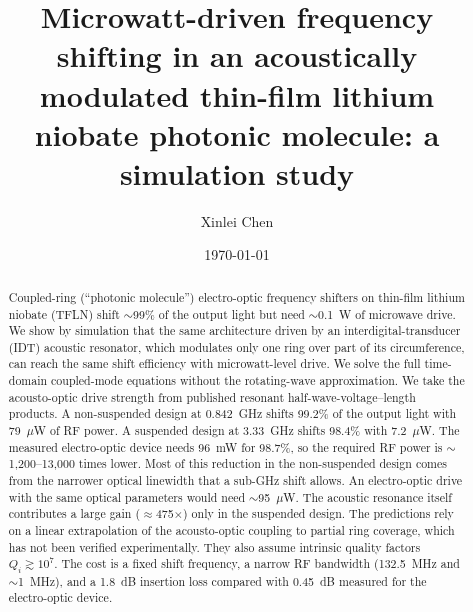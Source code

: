 \documentclass[aps,prl,reprint,superscriptaddress,amsmath,amssymb,floatfix]{revtex4-2}
\begin{document}
\title{Microwatt-driven frequency shifting in an acoustically modulated thin-film lithium niobate photonic molecule: a simulation study}

\author{Xinlei Chen}

\date{\today}

\begin{abstract}
Coupled-ring (``photonic molecule'') electro-optic frequency shifters on thin-film lithium niobate (TFLN) shift $\sim$99\% of the output light but need $\sim$0.1~W of microwave drive. We show by simulation that the same architecture driven by an interdigital-transducer (IDT) acoustic resonator, which modulates only one ring over part of its circumference, can reach the same shift efficiency with microwatt-level drive. We solve the full time-domain coupled-mode equations without the rotating-wave approximation. We take the acousto-optic drive strength from published resonant half-wave-voltage--length products. A non-suspended design at 0.842~GHz shifts 99.2\% of the output light with 79~$\mu$W of RF power. A suspended design at 3.33~GHz shifts 98.4\% with 7.2~$\mu$W. The measured electro-optic device needs 96~mW for 98.7\%, so the required RF power is $\sim$1{,}200--13{,}000 times lower. Most of this reduction in the non-suspended design comes from the narrower optical linewidth that a sub-GHz shift allows. An electro-optic drive with the same optical parameters would need $\sim$95~$\mu$W. The acoustic resonance itself contributes a large gain ($\approx$475$\times$) only in the suspended design. The predictions rely on a linear extrapolation of the acousto-optic coupling to partial ring coverage, which has not been verified experimentally. They also assume intrinsic quality factors $Q_i\gtrsim10^7$. The cost is a fixed shift frequency, a narrow RF bandwidth (132.5~MHz and $\sim$1~MHz), and a 1.8~dB insertion loss compared with 0.45~dB measured for the electro-optic device.
\end{abstract}

\maketitle
\end{document}
